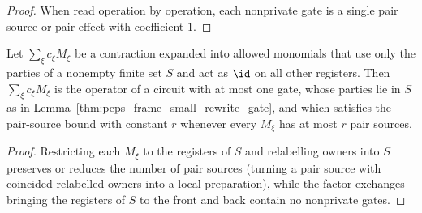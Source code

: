 \begin{proof}\leanok
    When read operation by operation, each nonprivate gate is a single
    pair source or pair effect with coefficient $1$.
\end{proof}

\begin{lemma}
    \label{lem:peps_party_gate_source_bound}
    \leanok
    Let $\sum_\xi c_\xi M_\xi$ be a contraction expanded into allowed
    monomials that use only the parties of a nonempty finite set $S$ and act
    as $\id$ on all other registers. Then $\sum_\xi c_\xi M_\xi$ is the operator of a
    circuit with at most one gate, whose parties lie in $S$ as in
    Lemma~\ref{thm:peps_frame_small_rewrite_gate}, and which satisfies the pair-source bound with constant $r$ whenever every
    $M_\xi$ has at most $r$ pair sources.
\end{lemma}

\begin{proof}\leanok
    Restricting each $M_\xi$ to the registers of $S$ and relabelling owners into $S$ preserves or reduces the number of pair sources (turning a pair source with coincided relabelled owners into a local preparation), while the factor exchanges bringing the registers of $S$ to the front and back contain no nonprivate gates.
\end{proof}

